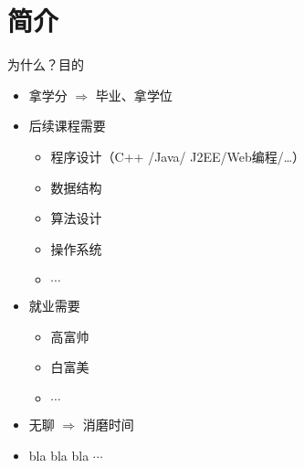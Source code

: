 \section[简介]{简介}
\begin{frame}{为什么？}{目的}  
  \begin{itemize}
  \item { 拿学分 $\Rightarrow$ 毕业、拿\alert{学位}}
  \item { 后续课程需要}
    \begin{itemize}
    \item 程序设计（C++ /Java/ J2EE/Web编程/\dots）
    \item \alert{数据结构}
    \item 算法设计
    \item 操作系统
    \item $\cdots$
    \end{itemize}
  \item { 就业需要}
    \begin{itemize}
    \item 高富帅
    \item 白富美
    \item $\cdots$
    \end{itemize}
  \item { 无聊 $\Rightarrow$ 消磨时间}  
  \item { bla bla bla $\cdots$}             
  \end{itemize}
\end{frame}


